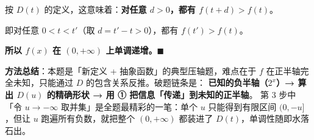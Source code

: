 \begin{answer}
按 $D(t)$ 的定义，这意味着：\textbf{对任意 $d>0$，都有 $f(t+d)>f(t)$}。

即对任意 $0<t<t'$（取 $d=t'-t>0$），都有 $f(t')>f(t)$。

\textbf{所以 $f(x)$ 在 $(0,+\infty)$ 上单调递增。$\blacksquare$}

\begin{gktip}
\textbf{方法总结}：本题是「新定义 + 抽象函数」的典型压轴题，难点在于 $f$ 在正半轴完全未知，只能通过 $D$ 的包含关系反推。破题链条是：
\textbf{已知的负半轴（$2^x$）→ 算出 $D(u)$ 的精确形状 → 用 ① 把信息「传递」到未知的正半轴}。
第 3 步中「令 $u\to-\infty$ 取并集」是全题最精彩的一笔：单个 $u$ 只能得到有限区间 $(0,-u]$，但让 $u$ 跑遍所有负数，就把整个 $(0,+\infty)$ 都装进了 $D(t)$，单调性随即水落石出。
\end{gktip}




\end{answer}